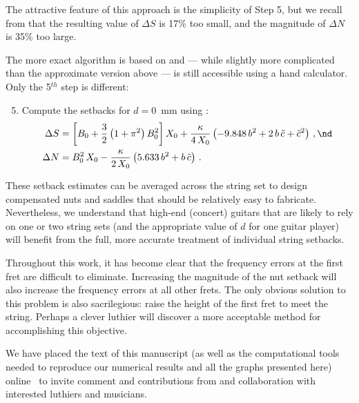 The attractive feature of this approach is the simplicity of Step 5, but we recall from  that the resulting value of $\Delta S$ is 17\% too small, and the magnitude of $\Delta N$ is 35\% too large.

The more exact algorithm is based on  and --- while slightly more complicated than the approximate version above --- is still accessible using a hand calculator. Only the 5$^{th}$ step is different:
\begin{enumerate}
    \setcounter{enumi}{4}
    \item Compute the setbacks for $d = 0$~mm using :
    \begin{align*}
        \Delta S &= \left[ B_0 + \frac{3}{2} \left(1 + \pi^2\right) B_0^2 \right] X_0 + \frac{\kappa}{4\, X_0} \left( -9.848\, b^2 + 2\, b\, \tilde{c} + \tilde{c}^2 \right)\, , \nd \\
        \Delta N &= B_0^2\, X_0 - \frac{\kappa}{2\, X_0} \left( 5.633\, b^2 + b\, \tilde{c} \right)\, .
    \end{align*}
\end{enumerate}
These setback estimates can be averaged across the string set to design compensated nuts and saddles that should be relatively easy to fabricate. Nevertheless, we understand that high-end (concert) guitars that are likely to rely on one or two string sets (and the appropriate value of $d$ for one guitar player) will benefit from the full, more accurate treatment of individual string setbacks.

Throughout this work, it has become clear that the frequency errors at the first fret are difficult to eliminate. Increasing the magnitude of the nut setback will also increase the frequency errors at all other frets. The only obvious solution to this problem is also sacrilegious: raise the height of the first fret to meet the string. Perhaps a clever luthier will discover a more acceptable method for accomplishing this objective.

We have placed the text of this manuscript (as well as the computational tools needed to reproduce our numerical results and all the graphs presented here) online~\cite{ref:github2021rgb} to invite comment and contributions from and collaboration with interested luthiers and musicians.